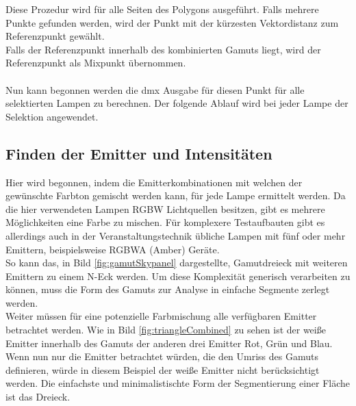 \documentclass[11pt]{scrartcl}
\begin{document}
Diese Prozedur wird für alle Seiten des Polygons ausgeführt. Falls mehrere Punkte gefunden werden, wird der Punkt mit der kürzesten Vektordistanz zum
Referenzpunkt gewählt.\\
Falls der Referenzpunkt innerhalb des kombinierten Gamuts liegt, wird der Referenzpunkt als Mixpunkt übernommen.\\
\\
Nun kann begonnen werden die \ac{dmx} Ausgabe für diesen Punkt für alle selektierten Lampen zu berechnen. Der folgende Ablauf wird bei jeder Lampe der Selektion
angewendet.
\subsection{Finden der Emitter und Intensitäten}
Hier wird begonnen, indem die Emitterkombinationen mit welchen der gewünschte Farbton gemischt werden kann, für jede Lampe ermittelt werden. Da die hier
verwendeten Lampen RGBW Lichtquellen besitzen, gibt es mehrere Möglichkeiten eine Farbe zu mischen. Für komplexere Testaufbauten gibt es allerdings auch in der
Veranstaltungstechnik übliche Lampen mit fünf oder mehr Emittern, beispielsweise RGBWA (Amber) Geräte.\\
So kann das, in Bild \ref{fig:gamutSkypanel} dargestellte, Gamutdreieck mit weiteren Emittern zu einem N-Eck werden. Um diese Komplexität generisch
verarbeiten zu können, muss die Form des Gamuts zur Analyse in einfache Segmente zerlegt werden.\\
Weiter müssen für eine potenzielle Farbmischung alle verfügbaren Emitter betrachtet werden. Wie in Bild \ref{fig:triangleCombined} zu sehen ist der weiße
Emitter innerhalb des Gamuts der anderen drei Emitter Rot, Grün und Blau. Wenn nun nur die Emitter betrachtet würden, die den Umriss des Gamuts
definieren, würde in diesem Beispiel der weiße Emitter nicht berücksichtigt werden. Die einfachste und minimalistischte Form der Segmentierung
einer Fläche ist das Dreieck.
\end{document}
